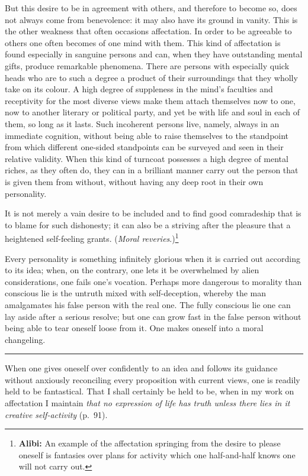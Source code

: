 \documentclass[12pt]{article}
\newcommand{\opage}[1]{\marginnote{\footnotesize\textit{[#1]}}}
\newcommand{\ombreak}{\par\medskip\begin{center}\rule{0.32\textwidth}{0.4pt}\end{center}\medskip}
\begin{document}
\opage{175}But this desire to be in agreement with others, and therefore to become so, does not always come from benevolence: it may also have its ground in vanity. This is the other weakness that often occasions affectation. In order to be agreeable to others one often becomes of one mind with them. This kind of affectation is found especially in sanguine persons and can, when they have outstanding mental gifts, produce remarkable phenomena. There are persons with especially quick heads who are to such a degree a product of their surroundings that they wholly take on its colour. A high degree of suppleness in the mind's faculties and receptivity for the most diverse views make them attach themselves now to one, now to another literary or political party, and yet be with life and soul in each of them, so long as it lasts. Such incoherent persons live, namely, always in an immediate cognition, without being able to raise themselves to the standpoint from which different one-sided standpoints can be surveyed and seen in their relative validity. When this kind of turncoat possesses a high degree of mental riches, as they often do, they can in a brilliant manner carry out the person that is given them from without, without having any deep root in their own personality.

It is not merely a vain desire to be included and to find good comradeship that is to blame for such dishonesty; it can also be a striving after the pleasure that a heightened self-feeling grants. (\emph{Moral reveries}.)\footnote{\textbf{Alibi:} An example of the affectation springing from the desire to please oneself is fantasies over plans for activity which one half-and-half knows one will not carry out.}

Every personality is something infinitely glorious when it is carried out according to its idea; when, on the contrary, one lets it be overwhelmed by alien considerations, one fails one's vocation. Perhaps \opage{176}more dangerous to morality than conscious lie is the untruth mixed with self-deception, whereby the man amalgamates his false person with the real one. The fully conscious lie one can lay aside after a serious resolve; but one can grow fast in the false person without being able to tear oneself loose from it. One makes oneself into a moral changeling.

\ombreak

When one gives oneself over confidently to an idea and follows its guidance without anxiously reconciling every proposition with current views, one is readily held to be fantastical. That I shall certainly be held to be, when in my work on affectation I maintain \emph{that no expression of life has truth unless there lies in it creative self-activity} (p.\ 91).
\end{document}
